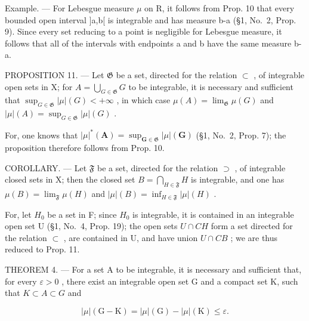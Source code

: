 Example. --- For Lebesgue measure \(\mu\) on R, it follows from Prop. 10 that every bounded open interval {]}a,b{[} is integrable and has measure b-a (§1, No.~2, Prop. 9). Since every set reducing to a point is negligible for Lebesgue measure, it follows that all of the intervals with endpoints a and b have the same measure b-a.

PROPOSITION 11. --- Let \(\mathfrak{G}\) be a set, directed for the relation \(\subset\) , of integrable open sets in X; for \(A = \bigcup_{G \in \mathfrak{G}} G\) to be integrable, it is necessary and sufficient that \(\sup_{G \in \mathfrak{G}} |\mu|(G) < +\infty\) , in which case \(\mu(A) = \lim_{\mathfrak{G}} \mu(G)\) and \(|\mu|(A) = \sup_{G \in \mathfrak{G}} |\mu|(G)\) .

For, one knows that \(|\mu|^*(\mathbf{A}) = \sup_{\mathbf{G} \in \mathfrak{G}} |\mu|(\mathbf{G})\) (§1, No.~2, Prop. 7); the proposition therefore follows from Prop. 10.

COROLLARY. --- Let \(\mathfrak{F}\) be a set, directed for the relation \(\supset\) , of integrable closed sets in X; then the closed set \(B = \bigcap_{H \in \mathfrak{F}} H\) is integrable, and one has \(\mu(B) = \lim_{\mathfrak{F}} \mu(H)\) and \(|\mu|(B) = \inf_{H \in \mathfrak{F}} |\mu|(H)\) .

For, let \(H_{0}\) be a set in F; since \(H_{0}\) is integrable, it is contained in an integrable open set U (§1, No.~4, Prop. 19); the open sets \(U \cap CH\) form a set directed for the relation \(\subset\) , are contained in U, and have union \(U \cap CB\) ; we are thus reduced to Prop. 11.

THEOREM 4. --- For a set A to be integrable, it is necessary and sufficient that, for every \(\varepsilon > 0\) , there exist an integrable open set G and a compact set K, such that \(K \subset A \subset G\) and

\[
| \mu | (\mathrm{G} - \mathrm{K}) = | \mu | (\mathrm{G}) - | \mu | (\mathrm{K}) \leqslant \varepsilon .
\]

